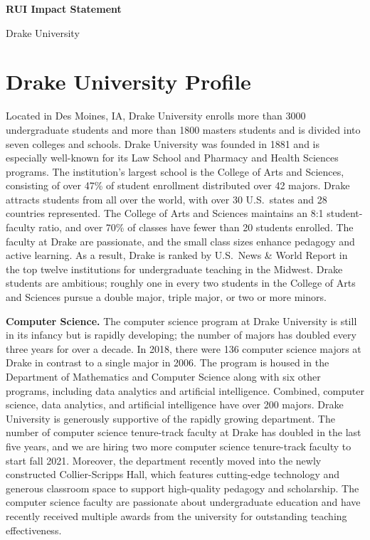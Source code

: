 \documentclass[11pt]{article}
\begin{document}
    \setcounter{page}{1}
    \begin{center}
        {\Large {\bf RUI Impact Statement}}
    \end{center}

    \begin{center}
        {\Large Drake University}
    \end{center}

    \section{Drake University Profile}
    Located in Des Moines, IA, Drake University enrolls more than 3000 undergraduate students and more than 1800 masters students
    and is divided into seven colleges and schools.
    Drake University was founded in 1881 and is especially well-known for its Law School and Pharmacy and Health Sciences programs.
    The institution's largest school is the College of Arts and Sciences, consisting of over 47\% of student enrollment distributed over 42 majors.
    Drake attracts students from all over the world, with over 30 U.S.\ states and 28 countries represented.
    The College of Arts and Sciences maintains an 8:1 student-faculty ratio, and over 70\% of classes have fewer than 20 students enrolled.
    The faculty at Drake are passionate, and the small class sizes enhance pedagogy and active learning.
    As a result, Drake is ranked by U.S.\ News \& World Report in the top twelve institutions for undergraduate teaching in the Midwest.
    Drake students are ambitious; roughly one in every two students in the College of Arts and Sciences pursue a double major, triple major, or two or more minors.

    \textbf{Computer Science.}
    The computer science program at Drake University is still in its infancy but is rapidly developing; the number of majors has doubled every three years for over a decade.
    In 2018, there were 136 computer science majors at Drake in contrast to a single major in 2006.
    The program is housed in the Department of Mathematics and Computer Science along with six other programs, including data analytics and artificial intelligence.
    Combined, computer science, data analytics, and artificial intelligence have over 200 majors.
    Drake University is generously supportive of the rapidly growing department.
    The number of computer science tenure-track faculty at Drake has doubled in the last five years, and we are hiring two more computer science tenure-track faculty to start fall 2021.
    Moreover, the department recently moved into the newly constructed Collier-Scripps Hall, which features cutting-edge technology and generous classroom space to support high-quality pedagogy and scholarship.
    The computer science faculty are passionate about undergraduate education and have recently received multiple awards from the university for outstanding teaching effectiveness.
\end{document}

